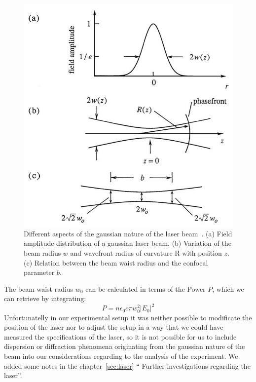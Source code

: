 \begin{figure}
    \begin{centering}
    \includegraphics[width=13cm]{figures/gaussian}
    \caption{Different aspects of the gaussian nature of the laser beam~\cite{boyd2003nonlinear}.
        (a) Field amplitude distribution of a gaussian laser beam. (b) Variation of the beam
        radius $w$ and wavefront radius of curvature R with position $z$.
        (c) Relation between the beam waist radius and the confocal parameter $b$. }
    \end{centering}
\end{figure}
The beam waist radius $w_{0}$ can be calculated in terms of the Power $P$, which we can retrieve
by integrating:
\begin{equation}
    P = n \epsilon_0 c \pi w_0^2 |E_0|^2
\end{equation}
Unfortunatelly in our experimental setup it was neither possible to modificate the position of
the laser nor to adjust the setup in a way that we could have measured the specifications of 
the laser, so it is not possible for us to include dispersion or diffraction phenomena originating
from the gaussian nature of the beam into our considerations regarding to the analysis of the 
experiment. We added some notes in the chapter~\ref{sec:laser} ``
Further investigations regarding the laser''.

